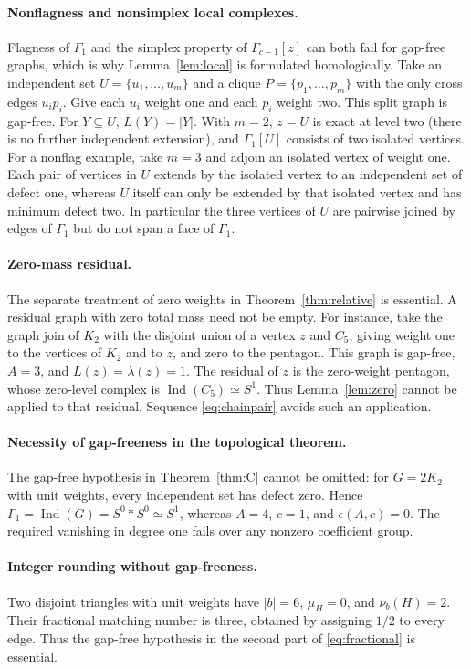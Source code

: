 \documentclass[11pt,a4paper]{article}
\theoremstyle{definition}
\newcommand{\Ind}{\operatorname{Ind}}
\newcommand{\G}{\Gamma}
\begin{document}
\paragraph{Nonflagness and nonsimplex local complexes.}
Flagness of $\G_1$ and the simplex property of $\G_{c-1}[z]$ can both fail for gap-free graphs, which is why Lemma~\ref{lem:local} is formulated homologically. Take an independent set $U=\{u_1,\ldots,u_m\}$ and a clique $P=\{p_1,\ldots,p_m\}$ with the only cross edges $u_ip_i$. Give each $u_i$ weight one and each $p_i$ weight two. This split graph is gap-free. For $Y\subseteq U$, $L(Y)=|Y|$. With $m=2$, $z=U$ is exact at level two (there is no further independent extension), and $\G_1[U]$ consists of two isolated vertices. For a nonflag example, take $m=3$ and adjoin an isolated vertex of weight one. Each pair of vertices in $U$ extends by the isolated vertex to an independent set of defect one, whereas $U$ itself can only be extended by that isolated vertex and has minimum defect two. In particular the three vertices of $U$ are pairwise joined by edges of $\G_1$ but do not span a face of $\G_1$.

\paragraph{Zero-mass residual.}
The separate treatment of zero weights in Theorem~\ref{thm:relative} is essential. A residual graph with zero total mass need not be empty. For instance, take the graph join of $K_2$ with the disjoint union of a vertex $z$ and $C_5$, giving weight one to the vertices of $K_2$ and to $z$, and zero to the pentagon. This graph is gap-free, $A=3$, and $L(z)=\lambda(z)=1$. The residual of $z$ is the zero-weight pentagon, whose zero-level complex is $\Ind(C_5)\simeq S^1$. Thus Lemma~\ref{lem:zero} cannot be applied to that residual. Sequence \eqref{eq:chainpair} avoids such an application.

\paragraph{Necessity of gap-freeness in the topological theorem.}
The gap-free hypothesis in Theorem~\ref{thm:C} cannot be omitted: for $G=2K_2$ with unit weights, every independent set has defect zero. Hence $\G_1=\Ind(G)=S^0*S^0\simeq S^1$, whereas $A=4$, $c=1$, and $\epsilon(A,c)=0$. The required vanishing in degree one fails over any nonzero coefficient group.

\paragraph{Integer rounding without gap-freeness.}
Two disjoint triangles with unit weights have $|b|=6$, $\mu_H=0$, and $\nu_b(H)=2$. Their fractional matching number is three, obtained by assigning $1/2$ to every edge. Thus the gap-free hypothesis in the second part of \eqref{eq:fractional} is essential.
\end{document}
